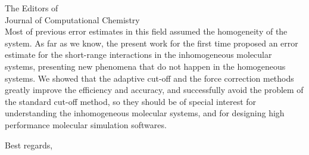 \documentclass{letter}
\begin{document}
\begin{letter}{
    The Editors of\\
    Journal of Computational Chemistry\\
    \vskip 1cm
  }
Most of previous error estimates in this field assumed the homogeneity
of the system. As far as we know, the present work for the first time
proposed an error estimate for the short-range interactions in the
inhomogeneous molecular systems, presenting new phenomena that do not
happen in the homogeneous systems.  We showed that the adaptive cut-off
and the force correction methods greatly improve the efficiency and
accuracy, and successfully avoid the problem of the standard cut-off
method, so they should be of special interest for
understanding the inhomogeneous molecular systems, and for
designing high
performance molecular simulation softwares.
\\
\vskip 3cm

\closing{Best regards,}


\end{letter} 
\end{document}
